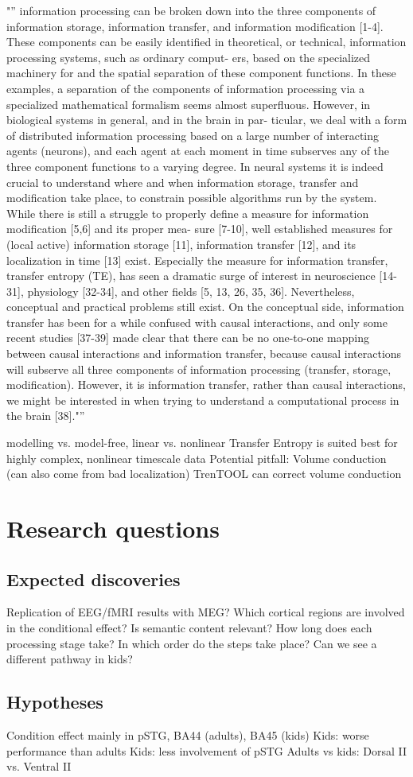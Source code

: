 "'' information processing can be broken down into the three components of
 information storage, information transfer, and information modification [1-4]. These components can be
 easily identified in theoretical, or technical, information processing systems, such as ordinary comput-
 ers, based on the specialized machinery for and the spatial separation of these component functions. In
 these examples, a separation of the components of information processing via a specialized mathematical
 formalism seems almost superfluous. However, in biological systems in general, and in the brain in par-
 ticular, we deal with a form of distributed information processing based on a large number of interacting
 agents (neurons), and each agent at each moment in time subserves any of the three component functions
 to a varying degree. In neural systems it is indeed crucial to understand where and when information
 storage, transfer and modification take place, to constrain possible algorithms run by the system. While
 there is still a struggle to properly define a measure for information modification [5,6] and its proper mea-
 sure [7-10], well established measures for (local active) information storage [11], information transfer [12],
 and its localization in time [13] exist.
 Especially the measure for information transfer, transfer entropy (TE), has seen a dramatic surge
 of interest in neuroscience [14-31], physiology [32-34], and other fields [5, 13, 26, 35, 36]. Nevertheless,
 conceptual and practical problems still exist. On the conceptual side, information transfer has been for a
 while confused with causal interactions, and only some recent studies [37-39] made clear that there can be
 no one-to-one mapping between causal interactions and information transfer, because causal interactions
 will subserve all three components of information processing (transfer, storage, modification). However,
 it is information transfer, rather than causal interactions, we might be interested in when trying to
 understand a computational process in the brain [38]."''

modelling vs. model-free, linear vs. nonlinear
Transfer Entropy is suited best for highly complex, nonlinear timescale data
Potential pitfall: Volume conduction (can also come from bad localization)
TrenTOOL can correct volume conduction\section{Research questions}

\subsection{Expected discoveries}
Replication of EEG/fMRI results with MEG?
Which cortical regions are involved in the conditional effect?
Is semantic content relevant?
How long does each processing stage take?
In which order do the steps take place?
Can we see a different pathway in kids?

\subsection{Hypotheses}
Condition effect mainly in pSTG, BA44 (adults), BA45 (kids)
Kids: worse performance than adults
Kids: less involvement of pSTG
Adults vs kids: Dorsal II vs. Ventral II